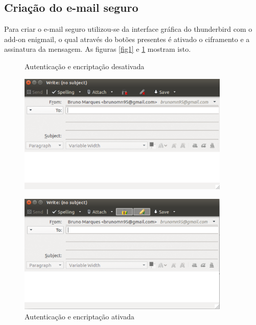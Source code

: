 \documentclass[
    article,            %
    11pt,               %
    oneside,            %
    a4paper,            %
    english,            %
    brazil,             %
    sumario=tradicional,
    ]{abntex2}
\begin{document}
\subsection{\textbf{Criação do e-mail seguro}}

Para criar o e-mail seguro utilizou-se da interface gráfica do thunderbird com o add-on enigmail, o qual através do botões presentes é ativado o ciframento e a assinatura da mensagem. As figuras \ref{fig1} e \ref{fig2} mostram isto.

\begin{figure}[H]
    \centering
    \begin{minipage}{0.45\textwidth}
        \centering
        \caption{Autenticação e encriptação desativada}
        \label{fig1}
        \includegraphics[width=0.9\textwidth]{imgs/auth-encript-disabled.pdf} %
    \end{minipage}\hfill
    \begin{minipage}{0.45\textwidth}
        \centering
        \caption{Autenticação e encriptação ativada}
        \label{fig2}
        \includegraphics[width=0.9\textwidth]{imgs/auth-encript-enabled.pdf} %
    \end{minipage}
\end{figure}
\end{document}
